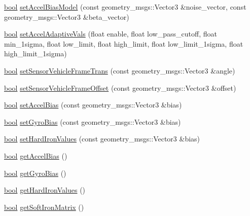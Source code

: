 \begin{DoxyCompactItemize}
\item 
\hyperlink{classbool}{bool} \hyperlink{classcl__microstrain__mips_1_1ClMicrostainMips_a809131028b774a3026a3f6894db0dc8f}{set\+Accel\+Bias\+Model} (const geometry\+\_\+msgs\+::\+Vector3 \&noise\+\_\+vector, const geometry\+\_\+msgs\+::\+Vector3 \&beta\+\_\+vector)
\item 
\hyperlink{classbool}{bool} \hyperlink{classcl__microstrain__mips_1_1ClMicrostainMips_a4687c5a4ea6de01c41d96f3aeb58fa24}{set\+Accel\+Adaptive\+Vals} (float enable, float low\+\_\+pass\+\_\+cutoff, float min\+\_\+1sigma, float low\+\_\+limit, float high\+\_\+limit, float low\+\_\+limit\+\_\+1sigma, float high\+\_\+limit\+\_\+1sigma)
\item 
\hyperlink{classbool}{bool} \hyperlink{classcl__microstrain__mips_1_1ClMicrostainMips_a4dd8966794ba1697319f0f1812160405}{set\+Sensor\+Vehicle\+Frame\+Trans} (const geometry\+\_\+msgs\+::\+Vector3 \&angle)
\item 
\hyperlink{classbool}{bool} \hyperlink{classcl__microstrain__mips_1_1ClMicrostainMips_a2b2786c142088f7d8e0fba6fc67d3a88}{set\+Sensor\+Vehicle\+Frame\+Offset} (const geometry\+\_\+msgs\+::\+Vector3 \&offset)
\item 
\hyperlink{classbool}{bool} \hyperlink{classcl__microstrain__mips_1_1ClMicrostainMips_a535b7afce9ff4288c94077fe8fc30f79}{set\+Accel\+Bias} (const geometry\+\_\+msgs\+::\+Vector3 \&bias)
\item 
\hyperlink{classbool}{bool} \hyperlink{classcl__microstrain__mips_1_1ClMicrostainMips_aabb65ca3b2e8be4a1ad2284d543ddd9c}{set\+Gyro\+Bias} (const geometry\+\_\+msgs\+::\+Vector3 \&bias)
\item 
\hyperlink{classbool}{bool} \hyperlink{classcl__microstrain__mips_1_1ClMicrostainMips_a6f9ae5ca80db4a93db8b01192d38b426}{set\+Hard\+Iron\+Values} (const geometry\+\_\+msgs\+::\+Vector3 \&bias)
\item 
\hyperlink{classbool}{bool} \hyperlink{classcl__microstrain__mips_1_1ClMicrostainMips_a97ef55f8b10be52f44ae585ccd4e7db9}{get\+Accel\+Bias} ()
\item 
\hyperlink{classbool}{bool} \hyperlink{classcl__microstrain__mips_1_1ClMicrostainMips_aaa1e9015c879e48776a803f55add33e2}{get\+Gyro\+Bias} ()
\item 
\hyperlink{classbool}{bool} \hyperlink{classcl__microstrain__mips_1_1ClMicrostainMips_aa138907ebb7fb634373f948028202749}{get\+Hard\+Iron\+Values} ()
\item 
\hyperlink{classbool}{bool} \hyperlink{classcl__microstrain__mips_1_1ClMicrostainMips_ad605051aea5b2fe25de85314deb1aa39}{get\+Soft\+Iron\+Matrix} ()

\end{DoxyCompactItemize}
